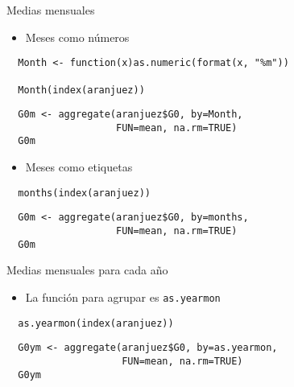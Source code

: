 \documentclass[xcolor={usenames,svgnames,dvipsnames}]{beamer}
\begin{document}
\begin{frame}[fragile,label=sec-3-3]{Medias mensuales}
 \begin{itemize}
\item Meses como números
\end{itemize}
\lstset{language=R,label= ,caption= ,numbers=none}
\begin{lstlisting}
  Month <- function(x)as.numeric(format(x, "%m"))
  
  Month(index(aranjuez))
\end{lstlisting}

\lstset{language=R,label= ,caption= ,numbers=none}
\begin{lstlisting}
  G0m <- aggregate(aranjuez$G0, by=Month,
                   FUN=mean, na.rm=TRUE)
  G0m
\end{lstlisting}

\begin{itemize}
\item Meses como etiquetas
\end{itemize}
\lstset{language=R,label= ,caption= ,numbers=none}
\begin{lstlisting}
  months(index(aranjuez))
\end{lstlisting}

\lstset{language=R,label= ,caption= ,numbers=none}
\begin{lstlisting}
  G0m <- aggregate(aranjuez$G0, by=months,
                   FUN=mean, na.rm=TRUE)
  G0m
\end{lstlisting}
\end{frame}

\begin{frame}[fragile,label=sec-3-4]{Medias mensuales para cada año}
 \begin{itemize}
\item La función para agrupar es \texttt{as.yearmon}
\end{itemize}
\lstset{language=R,label= ,caption= ,numbers=none}
\begin{lstlisting}
  as.yearmon(index(aranjuez))
\end{lstlisting}

\lstset{language=R,label= ,caption= ,numbers=none}
\begin{lstlisting}
  G0ym <- aggregate(aranjuez$G0, by=as.yearmon,
                    FUN=mean, na.rm=TRUE)
  G0ym
\end{lstlisting}
\end{frame}
\end{document}
